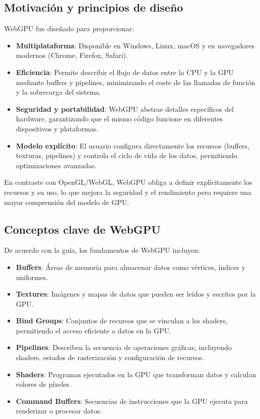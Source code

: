 \subsection{Motivación y principios de diseño}

WebGPU fue diseñado para proporcionar:

\begin{itemize}
    \item \textbf{Multiplataforma}: Disponible en Windows, Linux, macOS y en navegadores modernos (Chrome, Firefox, Safari).
    \item \textbf{Eficiencia}: Permite describir el flujo de datos entre la CPU y la GPU mediante buffers y pipelines, minimizando el coste de las llamadas de función y la sobrecarga del sistema.
    \item \textbf{Seguridad y portabilidad}: WebGPU abstrae detalles específicos del hardware, garantizando que el mismo código funcione en diferentes dispositivos y plataformas.
    \item \textbf{Modelo explícito}: El usuario configura directamente los recursos (buffers, texturas, pipelines) y controla el ciclo de vida de los datos, permitiendo optimizaciones avanzadas.
\end{itemize}

En contraste con OpenGL/WebGL, WebGPU obliga a definir explícitamente los
recursos y su uso, lo que mejora la seguridad y el rendimiento pero requiere
una mayor comprensión del modelo de GPU.

\subsection{Conceptos clave de WebGPU}

De acuerdo con la guía, los fundamentos de WebGPU incluyen:

\begin{itemize}
    \item \textbf{Buffers}: Áreas de memoria para almacenar datos como vértices, índices y uniformes.
    \item \textbf{Textures}: Imágenes y mapas de datos que pueden ser leídos y escritos por la GPU.
    \item \textbf{Bind Groups}: Conjuntos de recursos que se vinculan a los shaders, permitiendo el acceso eficiente a datos en la GPU.
    \item \textbf{Pipelines}: Describen la secuencia de operaciones gráficas, incluyendo shaders, estados de rasterización y configuración de recursos.
    \item \textbf{Shaders}: Programas ejecutados en la GPU que transforman datos y calculan colores de píxeles.
    \item \textbf{Command Buffers}: Secuencias de instrucciones que la GPU ejecuta para renderizar o procesar datos.
\end{itemize}

